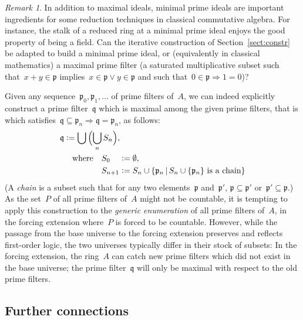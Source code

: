 \documentclass[com,11pt,crcready]{iosart2x}
\theoremstyle{definition}
\theoremstyle{plain}
\theoremstyle{remark}
\newtheorem{remark}[definition]{Remark}
\newcommand{\?}{\,{:}\,}
\newcommand{\ppp}{\mathfrak{p}}
\newcommand{\qqq}{\mathfrak{q}}
\newcommand{\defeq}{\vcentcolon=}
\renewcommand{\_}{\mathpunct{.}\,}
\begin{document}
\begin{remark}In addition to maximal ideals, minimal prime ideals are important
ingredients for some reduction techniques in classical commutative algebra. For
instance, the stalk of a reduced ring at a minimal prime ideal enjoys the good
property of being a field. Can the iterative construction of Section~\ref{sect:constr} be adapted to
build a minimal prime ideal, or (equivalently in classical mathematics) a maximal prime
filter (a saturated multiplicative subset such that~$x + y \in \ppp$
implies~$x \in \ppp \vee y \in \ppp$ and such that~$0 \in \ppp \Rightarrow 1 = 0$)?

Given any sequence~$\ppp_0,\ppp_1,\ldots$ of prime filters of~$A$, we can indeed
explicitly construct a prime filter~$\qqq$ which is maximal among the given
prime filters, that is which satisfies~$\qqq \subseteq \ppp_n \Rightarrow \qqq
= \ppp_n$, as follows:
\begin{align*}
  \qqq &\defeq \bigcup\,\Bigl(\bigcup_n S_n\Bigr), \\
  &\quad\text{where}\quad S_{0\phantom{{}+n}} \defeq \emptyset, \\
  &\quad\phantom{\text{where}\quad} S_{n+1} \defeq S_n \cup \{ \ppp_n \,|\,
  \text{$S_n \cup \{\ppp_n\}$ is a chain} \}
\end{align*}
(A \emph{chain} is a subset such that for any two elements~$\ppp$ and~$\ppp'$,
$\ppp \subseteq \ppp'$ or~$\ppp' \subseteq \ppp$.) As the set~$P$ of all prime
filters of~$A$ might not be countable, it is tempting to apply this
construction to the \emph{generic enumeration} of all prime filters of~$A$,
in the forcing extension where~$P$ is forced to be countable. However,
while the passage from the base universe to the forcing extension preserves and
reflects first-order logic, the two universes typically differ in their stock
of subsets: In the forcing extension, the ring~$A$ can catch new prime filters
which did not exist in the base universe; the prime filter~$\qqq$ will only be
maximal with respect to the old prime filters.
\end{remark}



\subsection{Further connections}
\end{document}
